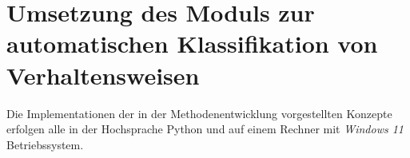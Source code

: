 \chapter{Umsetzung des Moduls zur automatischen Klassifikation von Verhaltensweisen} \label{chap:Umsetzung}
Die Implementationen der in der Methodenentwicklung vorgestellten Konzepte erfolgen alle in der Hochsprache \gls{Python} und auf einem Rechner mit \textit{Windows 11} Betriebssystem. 



